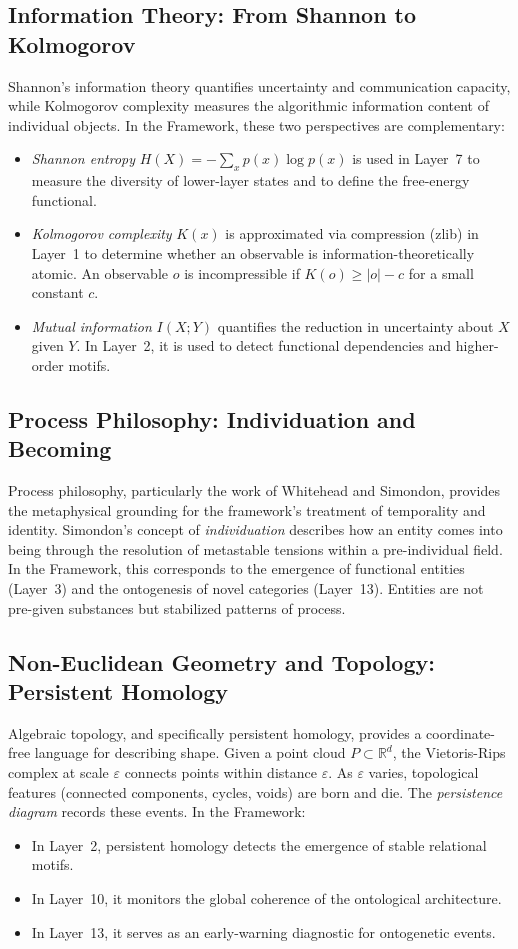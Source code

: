 \subsection{Information Theory: From Shannon to Kolmogorov}
Shannon's information theory quantifies uncertainty and communication capacity, while Kolmogorov complexity measures the algorithmic information content of individual objects. In the \Apeiron{} Framework, these two perspectives are complementary:
\begin{itemize}
    \item \emph{Shannon entropy} $H(X) = -\sum_x p(x) \log p(x)$ is used in Layer~7 to measure the diversity of lower-layer states and to define the free-energy functional.
    \item \emph{Kolmogorov complexity} $K(x)$ is approximated via compression (zlib) in Layer~1 to determine whether an observable is information-theoretically atomic. An observable $o$ is incompressible if $K(o) \ge |o| - c$ for a small constant $c$.
    \item \emph{Mutual information} $I(X;Y)$ quantifies the reduction in uncertainty about $X$ given $Y$. In Layer~2, it is used to detect functional dependencies and higher-order motifs.
\end{itemize}

\subsection{Process Philosophy: Individuation and Becoming}
Process philosophy, particularly the work of Whitehead and Simondon, provides the metaphysical grounding for the framework's treatment of temporality and identity. Simondon's concept of \emph{individuation} describes how an entity comes into being through the resolution of metastable tensions within a pre-individual field. In the \Apeiron{} Framework, this corresponds to the emergence of functional entities (Layer~3) and the ontogenesis of novel categories (Layer~13). Entities are not pre-given substances but stabilized patterns of process.

\subsection{Non-Euclidean Geometry and Topology: Persistent Homology}
Algebraic topology, and specifically persistent homology, provides a coordinate-free language for describing shape. Given a point cloud $P \subset \mathbb{R}^d$, the Vietoris-Rips complex at scale $\varepsilon$ connects points within distance $\varepsilon$. As $\varepsilon$ varies, topological features (connected components, cycles, voids) are born and die. The \emph{persistence diagram} records these events. In the \Apeiron{} Framework:
\begin{itemize}
    \item In Layer~2, persistent homology detects the emergence of stable relational motifs.
    \item In Layer~10, it monitors the global coherence of the ontological architecture.
    \item In Layer~13, it serves as an early-warning diagnostic for ontogenetic events.
\end{itemize}
